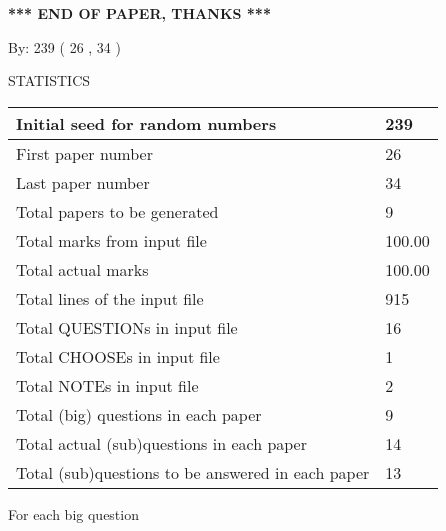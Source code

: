 \documentclass[12pt]{article}
\begin{document}
   
   
   
   
\vspace{1.0in} 
{\textbf{\large{ *** END OF PAPER, THANKS *** }}} 
   
   
\hspace{1.0in} By: 
         239 (          26 ,           34 )
   
   
   
\vspace{0.2in}
\vspace{0.2in}
   
   
 \newpage
\setcounter{page}{1} 
   
   
 {\LARGE{STATISTICS}}
   
\vspace{0.2in}
   
 \begin{tabular}{|l|l|}
 \hline
 Initial seed for random numbers &         239  \\
\hline
 First paper number &          26  \\
\hline
 Last  paper number &          34  \\
\hline
 Total papers to be generated &           9  \\
\hline
Total marks from input file & 100.00 \\
\hline
Total actual marks & 100.00 \\
\hline
 Total lines of the input file &         915  \\
 \hline
 Total QUESTIONs in input file &          16  \\
\hline
 Total CHOOSEs in input file &           1  \\
\hline
 Total NOTEs in input file &           2  \\
\hline
 Total (big) questions in each paper &           9  \\
\hline
 Total actual (sub)questions in each paper &          14  \\
\hline
 Total (sub)questions to be answered in each paper &          13  \\
\hline
 \end{tabular}
   
   
 \newpage
   
{\LARGE{For each big question}}
   
   
\vspace{0.2in}
   
\end{document}
